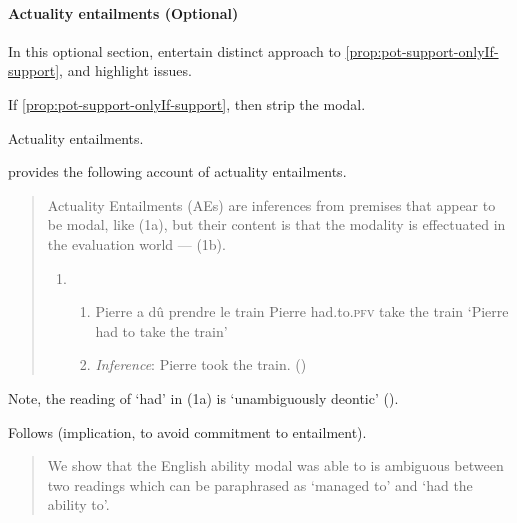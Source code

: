 \paragraph[Actuality entailments]{Actuality entailments \hfill (Optional)}
\nocite{Bhatt:1999ud}
\nocite{Hacquard:2006to}
\nocite{Werner:2011tp}

\begin{note}
  In this optional section, entertain distinct approach to \autoref{prop:pot-support-onlyIf-support}, and highlight issues.

  If \autoref{prop:pot-support-onlyIf-support}, then strip the modal.

  Actuality entailments.

  \textcite{Alxatib:2019wf} provides the following account of actuality entailments.
  \begin{quote}
    Actuality Entailments (AEs) are inferences from premises that appear to be modal, like (1a), but their content is that the modality is effectuated in the evaluation world --- (1b).

    \begin{enumerate}[label=(\arabic*)]
    \item
      \begin{enumerate}[label=\alph*.]
      \item Pierre a dû \hspace{26pt} prendre le \hspace{3.5pt} train \newline
        Pierre had.to.\textsc{pfv} take \hspace{14pt} the train\newline
        \hspace{-4pt} ‘Pierre had to take the train'
      \item \emph{Inference}: Pierre took the train.%
    \mbox{}\hfill\mbox{(\citeyear[701]{Alxatib:2019wf})}
      \end{enumerate}
    \end{enumerate}
  \end{quote}

  Note, the reading of `had' in (1a) is `unambiguously deontic' (\citeyear[703]{Alxatib:2019wf}).

  Follows \textcite{Bhatt:1999wq} (implication, to avoid commitment to entailment).

  \begin{quote}
    We show that the English ability modal was able to is ambiguous between two readings which can be paraphrased as `managed to' and `had the ability to'.


\end{quote}
\end{note}
